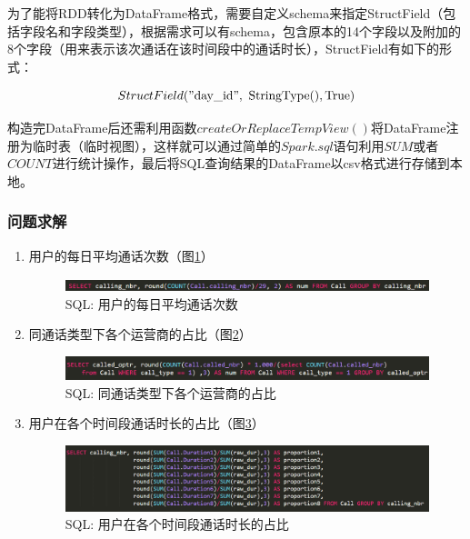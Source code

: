 \documentclass[12pt,a4paper]{article}
\begin{document}
为了能将RDD转化为DataFrame格式，需要自定义schema来指定StructField（包括字段名和字段类型），根据需求可以有schema，包含原本的14个字段以及附加的8个字段（用来表示该次通话在该时间段中的通话时长），StructField有如下的形式：

\begin{equation}
StructField(\mathrm{"day\_id",\ StringType(),True})
\end{equation}

构造完DataFrame后还需利用函数$createOrReplaceTempView()$将DataFrame注册为临时表（临时视图），这样就可以通过简单的$Spark.sql$语句利用$SUM$或者$COUNT$进行统计操作，最后将SQL查询结果的DataFrame以csv格式进行存储到本地。

\subsubsection{问题求解}
\begin{enumerate}
\item 用户的每日平均通话次数（图\ref{sql_1}）
\begin{figure}[htb]
\centering
\includegraphics[width=14cm]{sql_1}
\caption{SQL: 用户的每日平均通话次数 \label{sql_1}}
\end{figure}

\item 同通话类型下各个运营商的占比（图\ref{sql_2}）
\begin{figure}[htb]
\centering
\includegraphics[width=14cm]{sql_2}
\caption{SQL: 同通话类型下各个运营商的占比 \label{sql_2}}
\end{figure}

\item 用户在各个时间段通话时长的占比（图\ref{sql_3}）
\begin{figure}[htb]
\centering
\includegraphics[width=14cm]{sql_3}
\caption{SQL: 用户在各个时间段通话时长的占比 \label{sql_3}}
\end{figure}

\end{enumerate}
\end{document}
